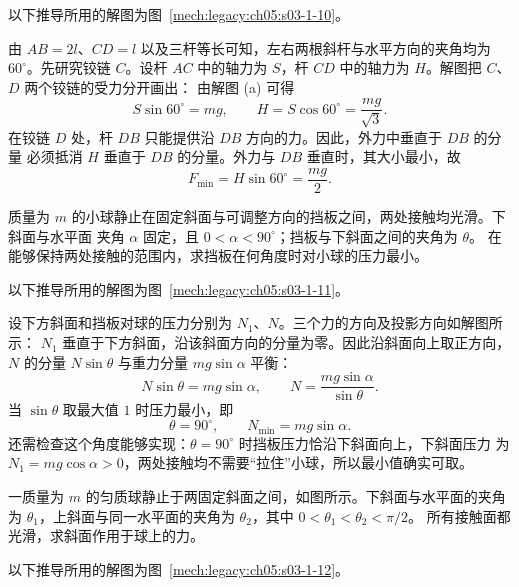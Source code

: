 {\begin{xesolution}
以下推导所用的解图为图~\ref{mech:legacy:ch05:s03-1-10}。

由 $AB=2l$、$CD=l$ 以及三杆等长可知，左右两根斜杆与水平方向的夹角均为
$60^\circ$。先研究铰链 $C$。设杆 $AC$ 中的轴力为 $S$，杆 $CD$ 中的轴力为 $H$。解图把
$C$、$D$ 两个铰链的受力分开画出：
\soldiagOneTen
由解图 (a) 可得
\[
  S\sin60^\circ=mg,
  \qquad
  H=S\cos60^\circ=\frac{mg}{\sqrt3}.
\]
在铰链 $D$ 处，杆 $DB$ 只能提供沿 $DB$ 方向的力。因此，外力中垂直于 $DB$ 的分量
必须抵消 $H$ 垂直于 $DB$ 的分量。外力与 $DB$ 垂直时，其大小最小，故
\[
  F_{\min}=H\sin60^\circ=\boxed{\frac{mg}{2}}.
\]
\end{xesolution}

\begin{origexamplebox}{}\label{ch05:ex:s03-1-11}
质量为 $m$ 的小球静止在固定斜面与可调整方向的挡板之间，两处接触均光滑。下斜面与水平面
夹角 $\alpha$ 固定，且 $0<\alpha<90^\circ$；挡板与下斜面之间的夹角为 $\theta$。
在能够保持两处接触的范围内，求挡板在何角度时对小球的压力最小。
\end{origexamplebox}

\Needspace{62mm}
\begin{xesolution}
以下推导所用的解图为图~\ref{mech:legacy:ch05:s03-1-11}。

设下方斜面和挡板对球的压力分别为 $N_1$、$N$。三个力的方向及投影方向如解图所示：
\soldiagOneEleven
$N_1$ 垂直于下方斜面，沿该斜面方向的分量为零。因此沿斜面向上取正方向，
$N$ 的分量 $N\sin\theta$ 与重力分量 $mg\sin\alpha$ 平衡：
\[
  N\sin\theta=mg\sin\alpha,
  \qquad
  N=\frac{mg\sin\alpha}{\sin\theta}.
\]
当 $\sin\theta$ 取最大值 $1$ 时压力最小，即
\[
  \boxed{\theta=90^\circ},
  \qquad
  \boxed{N_{\min}=mg\sin\alpha}.
\]
还需检查这个角度能够实现：$\theta=90^\circ$ 时挡板压力恰沿下斜面向上，下斜面压力
为 $N_1=mg\cos\alpha>0$，两处接触均不需要“拉住”小球，所以最小值确实可取。
\end{xesolution}

\begin{origexamplebox}{}\label{ch05:ex:s03-1-12}
一质量为 $m$ 的匀质球静止于两固定斜面之间，如图所示。下斜面与水平面的夹角为
$\theta_1$，上斜面与同一水平面的夹角为 $\theta_2$，其中 $0<\theta_1<\theta_2<\pi/2$。
所有接触面都光滑，求斜面作用于球上的力。
\end{origexamplebox}

\begin{xesolution}
以下推导所用的解图为图~\ref{mech:legacy:ch05:s03-1-12}。


\end{xesolution}}
